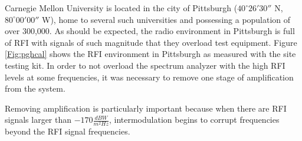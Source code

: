 Carnegie Mellon University is located in the city of Pittsburgh ($40^\circ 26'30''$ N, $80^\circ 00' 00''$ W), home to several such universities and possessing a population of over 300,000. As should be expected, the radio environment in Pittsburgh is full of RFI with signals of such magnitude that they overload test equipment. Figure \ref{Fig:pghcal} shows the RFI environment in Pittsburgh as measured with the site testing kit. In order to not overload the spectrum analyzer with the high RFI levels at some frequencies, it was necessary to remove one stage of amplification from the system. 

Removing amplification is particularly important because when there are RFI signals larger than $-170 \frac{dBW}{m^2 Hz}$, intermodulation begins to corrupt frequencies beyond the RFI signal frequencies. 


